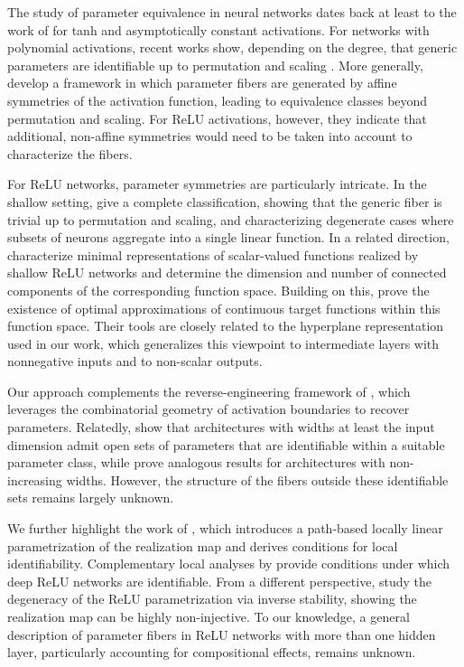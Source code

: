 \documentclass{article}
\theoremstyle{definition}
\begin{document}
The study of parameter equivalence in neural networks dates back at least to the work of \citet{SUSSMANN1992589,Kurkova1994,Fefferman1994ReconstructingAN} for tanh and asymptotically constant activations. 
%
For networks with polynomial activations, recent works show, depending on the degree, that generic parameters are identifiable up to permutation and scaling \citep{shahverdi2025learningrazorsedgesingularity, 
usevich2025identifiabilitydeeppolynomialneural, 
finkel2025activationdegreethresholdsexpressiveness}. 
%
More generally, \citet{vlacic2020affinesymmetriesneuralnetwork} develop a framework in which parameter fibers are generated by affine symmetries of the activation function, leading to equivalence classes beyond permutation and scaling. 
For ReLU activations, however, they indicate that additional, non-affine symmetries would need to be taken into account to characterize the fibers. 

For ReLU networks, parameter symmetries are particularly intricate. 
%
In the shallow setting, \citet{PetzkaTS20,
ramakrishnan2026completesymmetryclassificationshallow} give a complete
classification, showing that the generic fiber is trivial up to permutation and scaling, and characterizing degenerate cases where subsets of neurons aggregate into a single linear function. In a related direction, \citet{DEREICH2022121}
characterize minimal representations of scalar-valued functions realized by shallow ReLU
networks and determine the dimension and number of connected components of
the corresponding function space. Building on this, \citet{Dereich_2024} prove the existence of optimal
approximations of continuous target functions within this function space. Their tools are closely related to the
hyperplane representation used in our work, which generalizes this viewpoint
to intermediate layers with nonnegative inputs and to non-scalar outputs. 
 
Our approach complements the reverse-engineering framework of \citet{rolnick2020reverse}, which leverages the combinatorial geometry of activation boundaries to recover parameters. Relatedly, \citet{grigsby2023hiddensymmetriesrelunetworks} show that architectures with widths at least the input dimension admit open sets of parameters that are identifiable within a suitable parameter class, while \citet{phuong2020functional} prove analogous results for architectures with non-increasing widths. However, the structure of the fibers outside these identifiable sets remains largely unknown.

We further highlight the work of \citet{Stock2022}, which introduces a path-based locally linear parametrization of the realization map and derives conditions for local identifiability. 
%
Complementary local analyses by \citet{bona-pellissier2022local,Bona-Pellissier2023} provide conditions under which deep ReLU networks are identifiable. 
%
From a different perspective, \citet{NEURIPS2019_04115ec3} study the degeneracy of the ReLU parametrization via inverse stability,  
showing the realization map can be highly non-injective. 
%
To our knowledge, a general description of parameter fibers in ReLU networks with more than one hidden layer, particularly accounting for compositional effects, remains unknown. 
\end{document}

